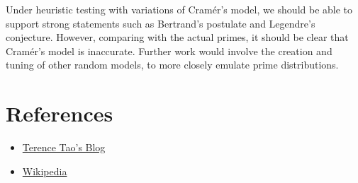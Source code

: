 \documentclass[12pt, letterpaper]{article}
\begin{document}
Under heuristic testing with variations of Cram\'er's model, we should be able to support strong statements such as Bertrand's postulate and Legendre's conjecture. However, comparing with the actual primes, it should be clear that Cram\'er's model is inaccurate. Further work would involve the creation and tuning of other random models, to more closely emulate prime distributions.

\section{References}

\begin{itemize}
    \item \href{http://terrytao.wordpress.com/2015/01/04/254a-supplement-4-probabilistic-models-and-heuristics-for-the-primes-optional/#more-7956}{Terence Tao's Blog}
    \item \href{https://en.wikipedia.org/wiki/Prime_gap}{Wikipedia}
\end{itemize}

 
\end{document}
